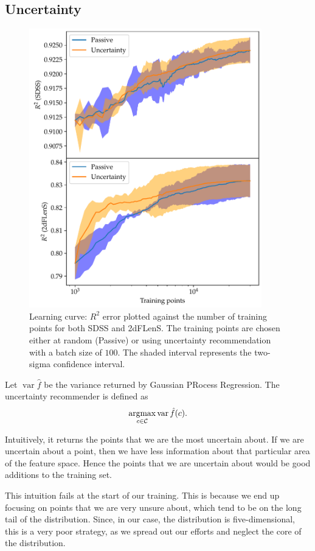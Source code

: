 \documentclass[11pt,twoside]{report}
\newcommand\cC{\mathcal{C}}
\DeclareMathOperator*{\argmax}{argmax}
\DeclareMathOperator{\var}{var}
\begin{document}
\subsection{Uncertainty}
  \begin{figure}
    \centering
    \includegraphics[width=0.9\textwidth]{uncertainty_r2.pdf}
    \caption{Learning curve: $R^2$ error plotted against the number of training points for both SDSS and 2dFLenS. The training points are chosen either at random (Passive) or using uncertainty recommendation with a batch size of $100$. The shaded interval represents the two-sigma confidence interval.}
    \label{fig:uncertainty_r2}
  \end{figure}

Let $\var \hat f$ be the variance returned by Gaussian PRocess Regression. The uncertainty recommender is defined as \[
    \argmax_{c \in \cC} \var\hat f(c) \text.
\]

Intuitively, it returns the points that we are the most uncertain about. If we are uncertain about a point, then we have less information about that particular area of the feature space. Hence the points that we are uncertain about would be good additions to the training set.

This intuition fails at the start of our training. This is because we end up focusing on points that we are very unsure about, which tend to be on the long tail of the distribution. Since, in our case, the distribution is five-dimensional, this is a very poor strategy, as we spread out our efforts and neglect the core of the distribution.
\end{document}
